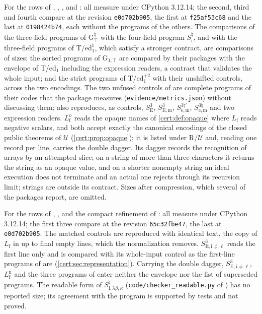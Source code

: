 For the rows of , , ,
 and : all measure under CPython
3.12.14; the second, third and fourth compare at the revision \texttt{e0d702b905}, the first at
\texttt{f25af53c68} and the last at \texttt{0198424b74}, each without the programs of the others.
The comparisons of the three-field programs of G$^{\natural}_{\top}$ with the four-field program
$S^{\natural}_{\mathrm i}$, and with the three-field programs of T/ed$_1^{\natural}$, which satisfy a
stronger contract, are comparisons of sizes; the sorted programs of G$_{1,\top}$ are compared by
their packages with the envelope of T/ed$_1$ including the expression readers, a contract that
validates the whole input; and the strict programs of T/ed$_1^{+2}$ with their unshifted controls,
across the two encodings. The two unfused controls of  are complete programs
of their codes that the package measures (\texttt{evidence/metrics.json}) without discussing them;
 also reproduces, as controls, $S^{3}_{\mathrm E}$, $S^{3}_{\mathrm{E,m}}$,
$S^{3\natural\prime}_{\mathrm{e,m}}$, $S^{3\natural}_{\mathrm{e,m}}$ and two expression readers.
$L^{\mathrm o}_{\mathrm f}$ reads the opaque names of \cref{cert:def:opaque} where $L_{\mathrm f}$
reads negative scalars, and both accept exactly the canonical encodings of the closed public
theorems of $\mathcal U$ (\cref{cert:prop:opaque}); it is listed under R/$\mathcal U$ and, reading
one record per line, carries the double dagger. Its dagger records the recognition of arrays by an
attempted slice; on a string of more than three characters it returns the string as an opaque
value, and on a shorter nonempty string an ideal execution does not terminate and an actual one
rejects through its recursion limit; strings are outside its contract. Sizes after compression, which several of the packages report, are omitted.

For the rows of , ,  and the
compact refinement of : all measure under CPython 3.12.14; the first three compare at
the revision \texttt{65c32fbe47}, the last at \texttt{e0d702b905}. The matched controls are reproduced
with identical text, the copy of $L_{\mathrm f}$ in  up to final empty lines,
which the normalization removes. $S^{3}_{\mathrm{E,i},\phi,\ell}$ reads the first line only and is
compared with its whole-input control as the first-line programs of  are
(\cref{cert:sec:representation}). Carrying the double dagger, $S^{3}_{\mathrm{E,i},\phi,\ell}$,
$L^{\mathrm n}_{\mathrm f}$ and the three programs of  enter neither the envelope
nor the list of superseded programs. The readable form of $S^{\natural}_{\mathrm{i},\lambda\beta,\kappa}$
(\texttt{code/checker\_readable.py} of ) has no reported size; its agreement with
the program is supported by tests and not proved.

